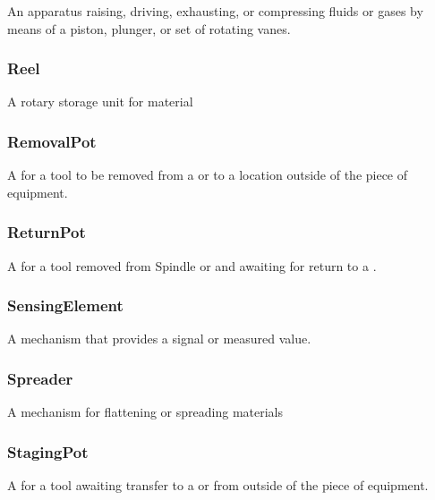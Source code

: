An apparatus raising, driving, exhausting, or compressing fluids or gases by means of a piston, plunger, or set of rotating vanes.


\subsubsection{Reel}
\label{sec:Reel}



A rotary storage unit for material


\subsubsection{RemovalPot}
\label{sec:RemovalPot}



A  for a tool to be removed from a  or  to a location outside of the piece of equipment.


\subsubsection{ReturnPot}
\label{sec:ReturnPot}



A  for a tool removed from \gls{Spindle} or  and awaiting for return to a .


\subsubsection{SensingElement}
\label{sec:SensingElement}



A mechanism that provides a signal or measured value.


\subsubsection{Spreader}
\label{sec:Spreader}



A mechanism for flattening or spreading materials


\subsubsection{StagingPot}
\label{sec:StagingPot}



A  for a tool awaiting transfer to a  or  from outside of the piece of equipment.


